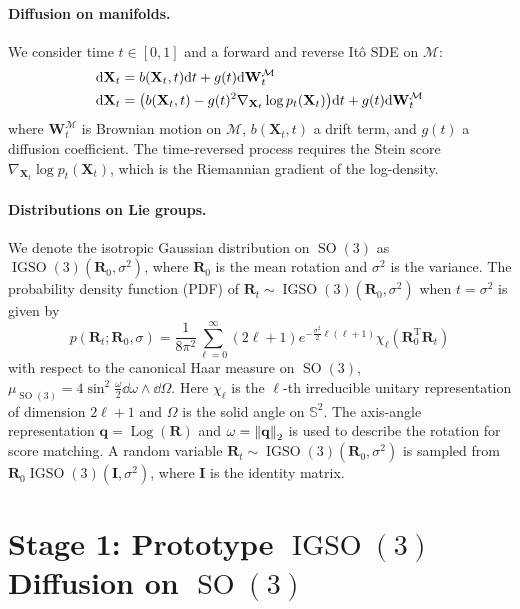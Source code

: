 \documentclass{article}
\theoremstyle{plain}
\theoremstyle{definition}
\theoremstyle{remark}
\DeclareMathOperator{\SO}{SO}
\DeclareMathOperator{\IGSO}{IGSO}
\DeclareMathOperator{\Log}{\operatorname{Log}}
\begin{document}
\paragraph{Diffusion on manifolds.}
We consider time $t\in[0, 1]$ and a forward and reverse It\^o SDE on $\mathcal{M}$:
\begin{align}
    \dd\mathbf{X}_t & = b(\mathbf{X}_t, t) \dd t + g(t) \dd \mathbf{W}_t^\mathcal{M}                                                             \\
    \dd\mathbf{X}_t & = \qty(b(\mathbf{X}_t, t) - g(t)^2 \nabla_{\mathbf{X}_t} \log p_t(\mathbf{X}_t)) \dd t + g(t) \dd \mathbf{W}_t^\mathcal{M}
\end{align}
where $\mathbf{W}_t^\mathcal{M}$ is Brownian motion on $\mathcal{M}$, $b(\mathbf{X}_t, t)$ a drift term, and $g(t)$ a diffusion coefficient. The time-reversed process requires the Stein score $\nabla_{\mathbf{X}_t} \log p_t(\mathbf{X}_t)$, which is the Riemannian gradient of the log-density.

\paragraph{Distributions on Lie groups.}
We denote the isotropic Gaussian distribution on $\SO(3)$ as $\IGSO(3)(\mathbf{R}_0, \sigma^2)$, where $\mathbf{R}_0$ is the mean rotation and $\sigma^2$ is the variance. The probability density function (PDF) of $\mathbf{R}_t \sim \IGSO(3)(\mathbf{R}_0, \sigma^2)$ when $t=\sigma^2$ is given by
\begin{equation}
    p(\mathbf{R}_t;\mathbf{R}_0, \sigma) = \frac{1}{8\pi^2}\sum_{\ell=0}^{\infty} (2\ell+1)e^{-\frac{\sigma^2}{2}\ell(\ell+1)}\chi_\ell(\mathbf{R}_0^\mathrm{T}\mathbf{R}_t)
\end{equation}
with respect to the canonical Haar measure on $\SO(3)$, $\mu_{\SO(3)} = 4\sin^2\frac{\omega}{2}\dd\omega\wedge\dd\varOmega$. Here $\chi_\ell$ is the $\ell$-th irreducible unitary representation of dimension $2\ell+1$ and $\varOmega$ is the solid angle on $\mathbb{S}^2$. The axis-angle representation $\mathbf{q} = \Log(\mathbf{R})$ and $\omega = \norm{\mathbf{q}}_2$ is used to describe the rotation for score matching. A random variable $\mathbf{R}_t\sim\IGSO(3)(\mathbf{R}_0, \sigma^2)$ is sampled from $\mathbf{R}_0\IGSO(3)(\mathbf{I}, \sigma^2)$, where $\mathbf{I}$ is the identity matrix.

\section{Stage 1: Prototype $\IGSO(3)$ Diffusion on $\SO(3)$}
\end{document}
